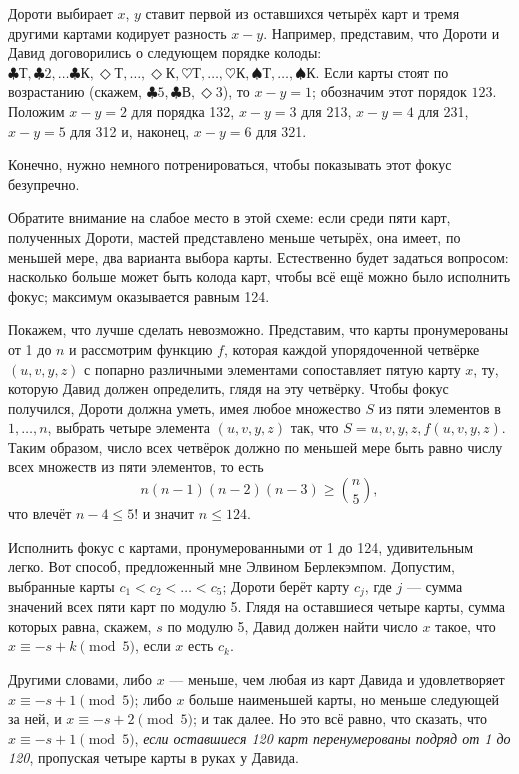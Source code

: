 Дороти выбирает $x$, $y$ ставит первой из оставшихся четырёх карт и тремя другими картами кодирует разность $x - y$.
Например, представим, что Дороти и Давид договорились о следующем порядке колоды: 
$\clubsuit \text{Т}, \clubsuit 2,\dots \clubsuit \text{К}, \Diamond \text{Т},\dots, \Diamond \text{К}, \heartsuit \text{Т}, \dots, \heartsuit \text{К}, \spadesuit  \text{Т}, \dots, \spadesuit \text{К}$.
Если карты стоят по возрастанию (скажем, $\clubsuit 5, \clubsuit \text{В}, \Diamond 3$), то $x - y = 1$; обозначим этот порядок $123$.
Положим $x-y=2$ для порядка 132,
$x-y=3$ для 213, $x-y=4$ для 231, $x-y=5$ для 312 и, наконец, $x-y=6$ для 321.

Конечно, нужно немного потренироваться, чтобы показывать этот фокус безупречно.

\medskip

Обратите внимание на слабое место в этой схеме: если среди пяти карт, полученных Дороти, мастей представлено меньше четырёх, она имеет, по меньшей мере, два варианта выбора карты.
Естественно будет задаться вопросом: насколько больше может быть колода карт, чтобы всё ещё можно было исполнить фокус;
максимум оказывается равным 124.

Покажем, что лучше сделать невозможно.
Представим, что карты пронумерованы от 1 до $n$ и рассмотрим функцию $f$, которая каждой упорядоченной четвёрке $(u,v,y,z)$ с попарно различными элементами сопоставляет пятую карту $x$, ту, которую Давид должен определить, глядя на эту четвёрку.
Чтобы фокус получился, Дороти должна уметь, имея
любое множество $S$ из пяти элементов в ${1, \dots, n}$, выбрать четыре элемента $(u,v,y,z)$ так, что $S = {u,v,y,z, f(u,v,y,z)}$.
Таким образом, число всех четвёрок должно по меньшей мере быть равно числу всех множеств из пяти элементов, то есть
\[n(n - 1)(n - 2)(n - 3)\ge \binom n5,\]
что влечёт $n - 4 \le5!$ и значит $n\le 124$.


Исполнить фокус с картами, пронумерованными от 1 до 124, удивительным легко.
Вот способ, предложенный мне Элвином Берлекэмпом.
Допустим, выбранные карты $c_1 < c_2 < \dots < c_5$;
Дороти берёт карту $c_j$, где $j$ --- сумма значений всех пяти карт по модулю 5.
Глядя на оставшиеся четыре карты, сумма которых равна, скажем, $s$ по модулю 5, Давид должен найти число $x$ такое, что $x\equiv -s + k \pmod 5$, если $x$ есть $c_k$.

Другими словами, либо $x$ --- меньше, чем любая из карт Давида и удовлетворяет 
$x\equiv-s + 1 \pmod 5$; либо $x$ больше наименьшей карты, но меньше следующей за ней, и 
$x\equiv -s + 2 \pmod 5$; и так далее.
Но это всё равно, что сказать, что $x\equiv -s + 1 \pmod 5$,
\emph{если оставшиеся 120 карт перенумерованы подряд от 1 до 120},
пропуская четыре карты в руках у Давида.

